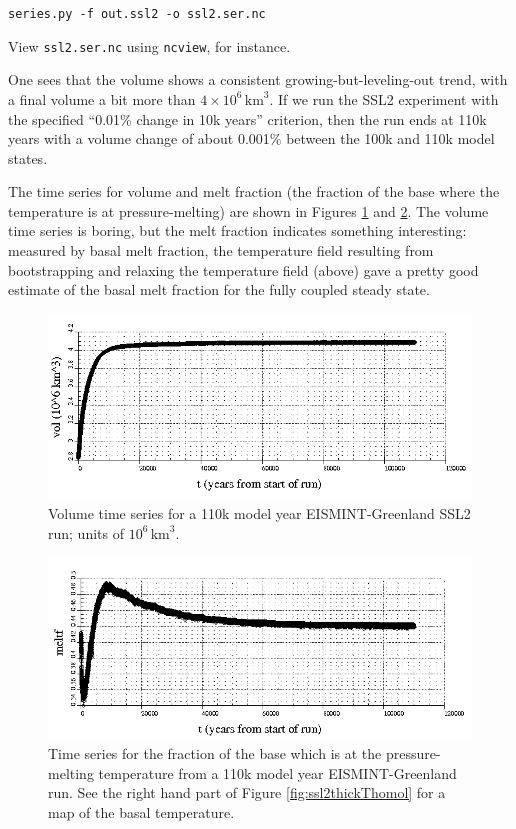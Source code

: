 \documentclass[11pt,final]{amsart}
\begin{document}
\verb|series.py -f out.ssl2 -o ssl2.ser.nc|

\noindent View \verb|ssl2.ser.nc| using \verb|ncview|, for instance.

One sees that the volume shows a consistent growing-but-leveling-out trend, with a final volume a bit more than $4 \times 10^{6}\,\text{km}^3$.  If we run the SSL2 experiment with the specified ``0.01\% change in 10k years'' criterion, then the run ends at 110k years with a volume change of about 0.001\% between the 100k and 110k model states.

The time series for volume and melt fraction (the fraction of the base where the temperature is at pressure-melting) are shown in Figures \ref{fig:eisgrnvolseries} and \ref{fig:eisgrnmeltfseries}.  The volume time series is boring, but the melt fraction indicates something interesting: measured by basal melt fraction, the temperature field resulting from bootstrapping and relaxing the temperature field (above) gave a pretty good estimate of the basal melt fraction for the fully coupled steady state.

\begin{figure}[ht]
\includegraphics[width=6.0in,keepaspectratio=true]{figs/eisgrn_volseries}
\caption{Volume time series for a 110k model year EISMINT-Greenland SSL2 run; units of $10^{6}\,\text{km}^3$.}
\label{fig:eisgrnvolseries}
\end{figure}

\begin{figure}[ht]
\includegraphics[width=6.0in,keepaspectratio=true]{figs/eisgrn_meltfseries}
\caption{Time series for the fraction of the base which is at the pressure-melting temperature from a 110k model year EISMINT-Greenland run.  See the right hand part of Figure \ref{fig:ssl2thickThomol} for a map of the basal temperature.}
\label{fig:eisgrnmeltfseries}
\end{figure}
\end{document}
